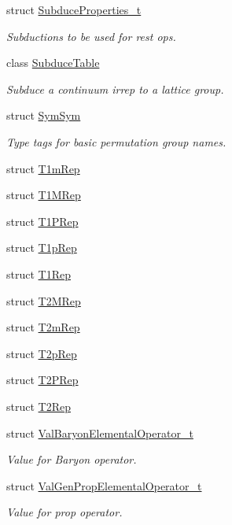 \begin{DoxyCompactItemize}
struct \mbox{\hyperlink{structHadron_1_1SubduceProperties__t}{Subduce\+Properties\+\_\+t}}
\begin{DoxyCompactList}\small\item\em Subductions to be used for rest ops. \end{DoxyCompactList}\item 
class \mbox{\hyperlink{classHadron_1_1SubduceTable}{Subduce\+Table}}
\begin{DoxyCompactList}\small\item\em Subduce a continuum irrep to a lattice group. \end{DoxyCompactList}\item 
struct \mbox{\hyperlink{structHadron_1_1SymSym}{Sym\+Sym}}
\begin{DoxyCompactList}\small\item\em Type tags for basic permutation group names. \end{DoxyCompactList}\item 
struct \mbox{\hyperlink{structHadron_1_1T1mRep}{T1m\+Rep}}
\item 
struct \mbox{\hyperlink{structHadron_1_1T1MRep}{T1\+M\+Rep}}
\item 
struct \mbox{\hyperlink{structHadron_1_1T1PRep}{T1\+P\+Rep}}
\item 
struct \mbox{\hyperlink{structHadron_1_1T1pRep}{T1p\+Rep}}
\item 
struct \mbox{\hyperlink{structHadron_1_1T1Rep}{T1\+Rep}}
\item 
struct \mbox{\hyperlink{structHadron_1_1T2MRep}{T2\+M\+Rep}}
\item 
struct \mbox{\hyperlink{structHadron_1_1T2mRep}{T2m\+Rep}}
\item 
struct \mbox{\hyperlink{structHadron_1_1T2pRep}{T2p\+Rep}}
\item 
struct \mbox{\hyperlink{structHadron_1_1T2PRep}{T2\+P\+Rep}}
\item 
struct \mbox{\hyperlink{structHadron_1_1T2Rep}{T2\+Rep}}
\item 
struct \mbox{\hyperlink{structHadron_1_1ValBaryonElementalOperator__t}{Val\+Baryon\+Elemental\+Operator\+\_\+t}}
\begin{DoxyCompactList}\small\item\em Value for Baryon operator. \end{DoxyCompactList}\item 
struct \mbox{\hyperlink{structHadron_1_1ValGenPropElementalOperator__t}{Val\+Gen\+Prop\+Elemental\+Operator\+\_\+t}}
\begin{DoxyCompactList}\small\item\em Value for prop operator. \end{DoxyCompactList}\item 

\end{DoxyCompactItemize}
